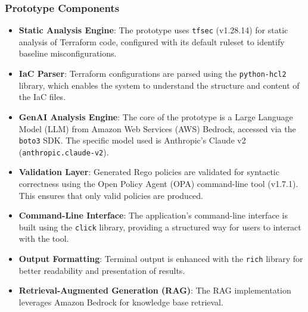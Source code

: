 
\subsubsection*{Prototype Components}
\begin{itemize}
    \item \textbf{Static Analysis Engine}: The prototype uses \texttt{tfsec} (v1.28.14) for static analysis of Terraform code, configured with its default ruleset to identify baseline misconfigurations.
    \item \textbf{IaC Parser}: Terraform configurations are parsed using the \texttt{python-hcl2} library, which enables the system to understand the structure and content of the IaC files.
    \item \textbf{GenAI Analysis Engine}: The core of the prototype is a Large Language Model (LLM) from Amazon Web Services (AWS) Bedrock, accessed via the \texttt{boto3} SDK. The specific model used is Anthropic's Claude v2 (\texttt{anthropic.claude-v2}).
    \item \textbf{Validation Layer}: Generated Rego policies are validated for syntactic correctness using the Open Policy Agent (OPA) command-line tool (v1.7.1). This ensures that only valid policies are produced.
    \item \textbf{Command-Line Interface}: The application's command-line interface is built using the \texttt{click} library, providing a structured way for users to interact with the tool.
    \item \textbf{Output Formatting}: Terminal output is enhanced with the \texttt{rich} library for better readability and presentation of results.
    \item \textbf{Retrieval-Augmented Generation (RAG)}: The RAG implementation leverages Amazon Bedrock for knowledge base retrieval. %
\end{itemize}


